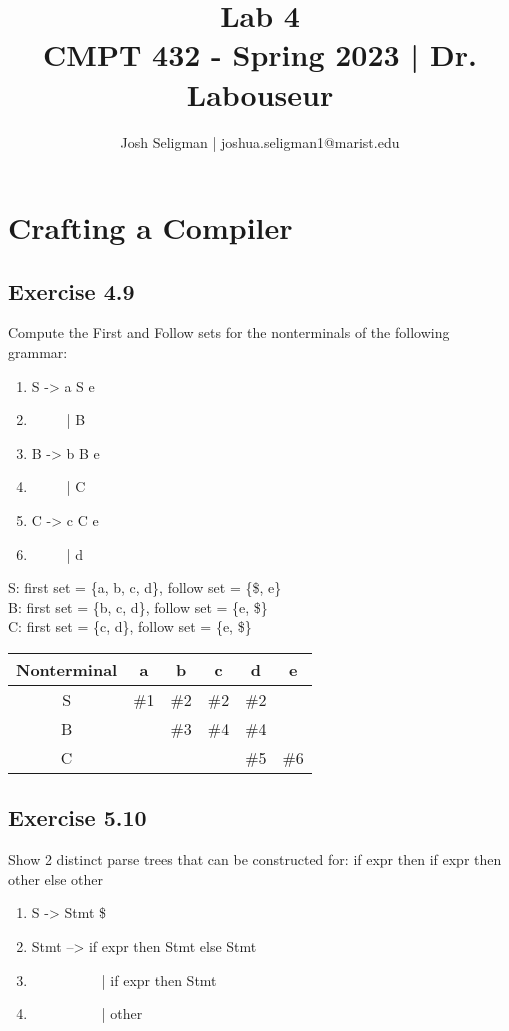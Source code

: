 \documentclass[letterpaper, 10pt, DIV=13]{scrartcl}
\title {
	\normalfont
	\huge{Lab 4} \\
	\vspace{10pt}
	\large{CMPT 432 - Spring 2023 | Dr. Labouseur}
}
\author{\normalfont Josh Seligman | joshua.seligman1@marist.edu}
\numberwithin{equation}{section}
\numberwithin{figure}{section}
\numberwithin{table}{section}
\begin{document}
\maketitle

\section{Crafting a Compiler}
\subsection{Exercise 4.9}
Compute the First and Follow sets for the nonterminals of the following grammar:
\begin{enumerate}
    \item S -> a S e
    \item ~~~~~| B
    \item B -> b B e
    \item ~~~~~| C
    \item C -> c C e
    \item ~~~~~| d
\end{enumerate}

S: first set = \{a, b, c, d\}, follow set = \{\$, e\} \\
B: first set = \{b, c, d\}, follow set = \{e, \$\} \\
C: first set = \{c, d\}, follow set = \{e, \$\} \\

\begin{tabular}{|c|c|c|c|c|c|}
    \hline
    Nonterminal & a & b & c & d & e \\
    \hline
    S & \#1 & \#2 & \#2 & \#2 & \\
    \hline
    B & & \#3 & \#4 & \#4 & \\
    \hline
    C & & & & \#5 & \#6 \\
    \hline
\end{tabular}

\subsection{Exercise 5.10}
Show 2 distinct parse trees that can be constructed for: if expr then if expr then other else other
\begin{enumerate}
    \item S -> Stmt \$
    \item Stmt --> if expr then Stmt else Stmt
    \item ~~~~~~~~~~| if expr then Stmt
    \item ~~~~~~~~~~| other
\end{enumerate}
\end{document}

